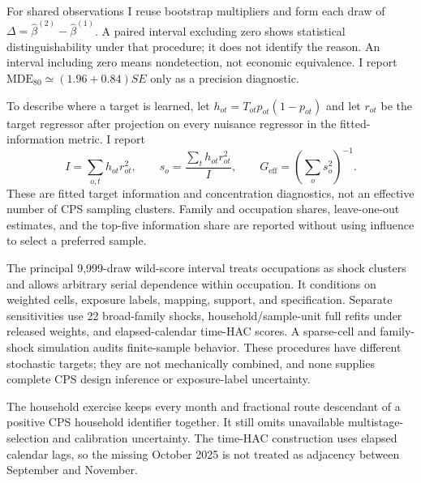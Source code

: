 For shared observations I reuse bootstrap multipliers and form each draw of $\Delta=\widehat\beta^{(2)}-\widehat\beta^{(1)}$.  A paired interval excluding zero shows statistical distinguishability under that procedure; it does not identify the reason.  An interval including zero means nondetection, not economic equivalence.  I report $\mathrm{MDE}_{80}\simeq(1.96+0.84)SE$ only as a precision diagnostic.

To describe where a target is learned, let $h_{ot}=T_{ot}p_{ot}(1-p_{ot})$ and let $r_{ot}$ be the target regressor after projection on every nuisance regressor in the fitted-information metric.  I report
\[
I=\sum_{o,t}h_{ot}r_{ot}^{2},\qquad
s_o=\frac{\sum_t h_{ot}r_{ot}^{2}}{I},\qquad
G_{\mathrm{eff}}=\left(\sum_o s_o^2\right)^{-1}.
\]
These are fitted target information and concentration diagnostics, not an effective number of CPS sampling clusters.  Family and occupation shares, leave-one-out estimates, and the top-five information share are reported without using influence to select a preferred sample.

The principal 9,999-draw wild-score interval treats occupations as shock clusters and allows arbitrary serial dependence within occupation.  It conditions on weighted cells, exposure labels, mapping, support, and specification.  Separate sensitivities use 22 broad-family shocks, household/sample-unit full refits under released weights, and elapsed-calendar time-HAC scores.  A sparse-cell and family-shock simulation audits finite-sample behavior.  These procedures have different stochastic targets; they are not mechanically combined, and none supplies complete CPS design inference or exposure-label uncertainty.

The household exercise keeps every month and fractional route descendant of a positive CPS household identifier together.  It still omits unavailable multistage-selection and calibration uncertainty.  The time-HAC construction uses elapsed calendar lags, so the missing October 2025 is not treated as adjacency between September and November.
